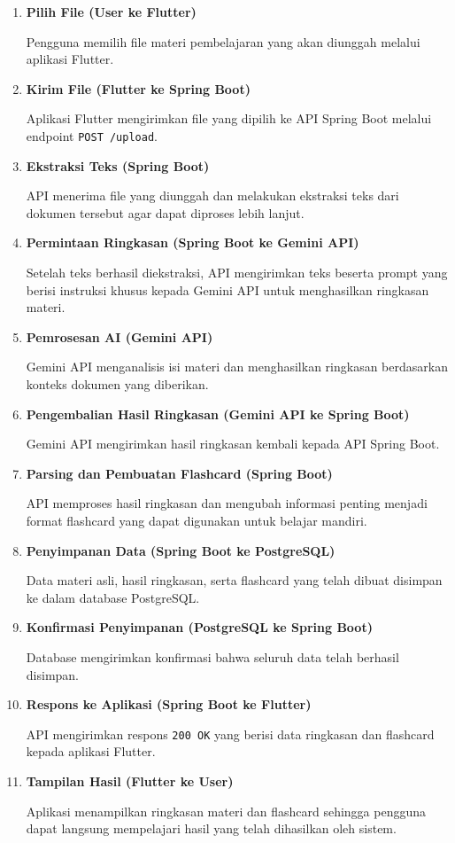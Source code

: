 \documentclass[11pt]{article}
\begin{document}
\begin{enumerate}

\item \textbf{Pilih File (User ke Flutter)}

Pengguna memilih file materi pembelajaran yang akan diunggah melalui aplikasi Flutter.

\item \textbf{Kirim File (Flutter ke Spring Boot)}

Aplikasi Flutter mengirimkan file yang dipilih ke API Spring Boot melalui endpoint \texttt{POST /upload}.

\item \textbf{Ekstraksi Teks (Spring Boot)}

API menerima file yang diunggah dan melakukan ekstraksi teks dari dokumen tersebut agar dapat diproses lebih lanjut.

\item \textbf{Permintaan Ringkasan (Spring Boot ke Gemini API)}

Setelah teks berhasil diekstraksi, API mengirimkan teks beserta prompt yang berisi instruksi khusus kepada Gemini API untuk menghasilkan ringkasan materi.

\item \textbf{Pemrosesan AI (Gemini API)}

Gemini API menganalisis isi materi dan menghasilkan ringkasan berdasarkan konteks dokumen yang diberikan.

\item \textbf{Pengembalian Hasil Ringkasan (Gemini API ke Spring Boot)}

Gemini API mengirimkan hasil ringkasan kembali kepada API Spring Boot.

\item \textbf{Parsing dan Pembuatan Flashcard (Spring Boot)}

API memproses hasil ringkasan dan mengubah informasi penting menjadi format flashcard yang dapat digunakan untuk belajar mandiri.

\item \textbf{Penyimpanan Data (Spring Boot ke PostgreSQL)}

Data materi asli, hasil ringkasan, serta flashcard yang telah dibuat disimpan ke dalam database PostgreSQL.

\item \textbf{Konfirmasi Penyimpanan (PostgreSQL ke Spring Boot)}

Database mengirimkan konfirmasi bahwa seluruh data telah berhasil disimpan.

\item \textbf{Respons ke Aplikasi (Spring Boot ke Flutter)}

API mengirimkan respons \texttt{200 OK} yang berisi data ringkasan dan flashcard kepada aplikasi Flutter.

\item \textbf{Tampilan Hasil (Flutter ke User)}

Aplikasi menampilkan ringkasan materi dan flashcard sehingga pengguna dapat langsung mempelajari hasil yang telah dihasilkan oleh sistem.

\end{enumerate}
\end{document}
